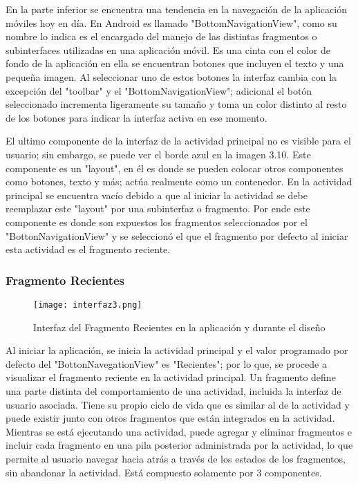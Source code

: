 \par \noindent
En la parte inferior se encuentra una tendencia en la navegación de la aplicación móviles hoy en día. En Android es llamado "BottomNavigationView", como su nombre lo indica es el encargado del manejo de las distintas fragmentos o subinterfaces utilizadas en una aplicación móvil. Es una cinta con el color de fondo de la aplicación en ella se encuentran botones que incluyen el texto y una pequeña imagen. Al seleccionar uno de estos botones la interfaz cambia con la excepción del "toolbar" y el "BottomNavigationView"; adicional el botón seleccionado incrementa ligeramente su tamaño y toma un color distinto al resto de los botones para indicar la interfaz activa en ese momento.

\par \noindent
El ultimo componente de la interfaz de la actividad principal no es visible para el usuario; sin embargo, se puede ver el borde azul en la imagen 3.10. Este componente es un "layout", en él es donde se pueden colocar otros componentes como botones, texto y más; actúa realmente como un contenedor. En la actividad principal se encuentra vacío debido a que al iniciar la actividad se debe reemplazar este "layout" por una subinterfaz o fragmento. Por ende este componente es donde son expuestos los fragmentos seleccionados por el "BottonNavigationView" y se seleccionó el que el fragmento por defecto al iniciar esta actividad es el fragmento reciente.

\subsubsection{Fragmento Recientes}

\begin{figure}[H]
	\centering
	\texttt{[image: interfaz3.png]}
	\caption{Interfaz del Fragmento Recientes en la aplicación y durante el diseño}
\end{figure}

\par \noindent
Al iniciar la aplicación, se inicia la actividad principal y el valor programado por defecto del "BottonNavegationView" es "Recientes"; por lo que, se procede a visualizar el fragmento reciente en la actividad principal. Un fragmento define una parte distinta del comportamiento de una actividad, incluida la interfaz de usuario asociada. Tiene su propio ciclo de vida que es similar al de la actividad y puede existir junto con otros fragmentos que están integrados en la actividad. Mientras se está ejecutando una actividad, puede agregar y eliminar fragmentos e incluir cada fragmento en una pila posterior administrada por la actividad, lo que permite al usuario navegar hacia atrás a través de los estados de los fragmentos, sin abandonar la actividad\cite{androidapp}. Está compuesto solamente por 3 componentes. 

